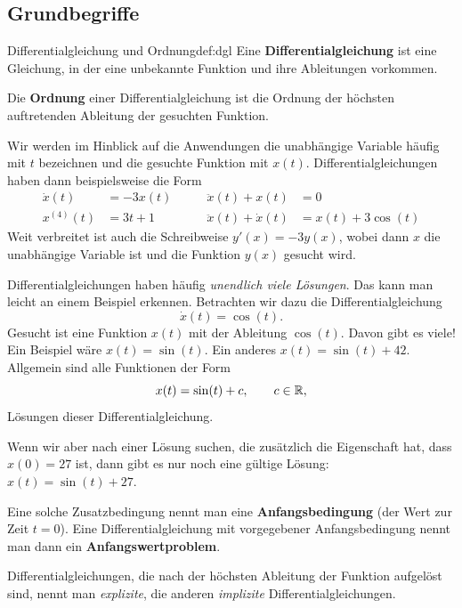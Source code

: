 \clearpage
\subsection{Grundbegriffe}

\begin{definition}{Differentialgleichung und Ordnung}{def:dgl}
    Eine \textbf{Differentialgleichung} ist eine Gleichung, in der
    eine unbekannte Funktion und ihre Ableitungen vorkommen.

    Die \textbf{Ordnung} einer Differentialgleichung ist die
    Ordnung der höchsten auftretenden Ableitung der gesuchten Funktion.
\end{definition}

Wir werden im Hinblick auf die Anwendungen die unabhängige Variable
häufig mit \(t\) bezeichnen und die gesuchte Funktion mit \(x(t)\).
Differentialgleichungen haben dann beispielsweise die Form
\[
    \begin{aligned}
        \dot{x}(t)             & = -3x(t)
                               & \qquad
        \ddot{x}(t)+x(t)       & = 0             \\[6pt]
        x^{(4)}(t)             & = 3t+1
                               & \qquad
        \ddot{x}(t)+\dot{x}(t) & = x(t)+3\cos(t)
    \end{aligned}
\]
Weit verbreitet ist auch die Schreibweise
\(y'(x)=-3y(x)\), wobei dann \(x\) die unabhängige Variable
ist und die Funktion \(y(x)\) gesucht wird.

Differentialgleichungen haben häufig \emph{unendlich viele Lösungen}.
Das kann man leicht an einem Beispiel erkennen.
Betrachten wir dazu die Differentialgleichung
\[
    \dot{x}(t)=\cos(t).
\]
Gesucht ist eine Funktion \(x(t)\) mit der Ableitung
\(\cos(t)\). Davon gibt es viele!
Ein Beispiel wäre \(x(t)=\sin(t)\).
Ein anderes \(x(t)=\sin(t)+42\).
Allgemein sind alle Funktionen der Form
\[
    x(t)=\sin(t)+c, \qquad c\in\mathbb{R},
\]
Lösungen dieser Differentialgleichung.

Wenn wir aber nach einer Lösung suchen, die zusätzlich
die Eigenschaft hat, dass \(x(0)=27\) ist, dann gibt es
nur noch eine gültige Lösung:
\(x(t)=\sin(t)+27\).

Eine solche Zusatzbedingung nennt man eine
\textbf{Anfangsbedingung} (der Wert zur Zeit \(t=0\)).
Eine Differentialgleichung mit vorgegebener Anfangsbedingung
nennt man dann ein \textbf{Anfangswertproblem}.

Differentialgleichungen, die nach der höchsten Ableitung
der Funktion aufgelöst sind, nennt man
\emph{explizite}, die anderen \emph{implizite}
Differentialgleichungen.


